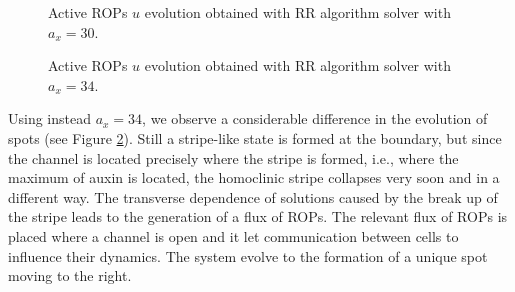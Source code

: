\begin{figure}[H]
    \centering
    \quad
    \quad
    \quad
    \caption[Tuning channel prm - $a_x = 30 $]{Active ROPs $u$ evolution obtained with RR algorithm solver with $a_x = 30 $.}
    \label{fig:a30}
\end{figure}
\begin{figure}[H]
    \centering
    \quad
    \quad
    \quad
    \quad
    \quad
    \quad
    \caption[Tuning channel prm - $a_x = 34 $]{Active ROPs $u$ evolution obtained with RR algorithm solver with $a_x = 34 $.}
    \label{fig:a34}
\end{figure}
Using instead $a_x = 34$, we observe a considerable difference in the evolution of spots (see Figure \ref{fig:a34}). Still a stripe-like state is formed at the boundary, but since the channel is located precisely where the stripe is formed, i.e., where the maximum of auxin is located, the homoclinic stripe collapses very soon and in a different way. The transverse dependence of solutions caused by the break up of the stripe leads to the generation of a flux of ROPs. The relevant flux of ROPs is placed where a channel is open and it let communication between cells to influence their dynamics. The system evolve to the formation of a unique spot moving to the right.

